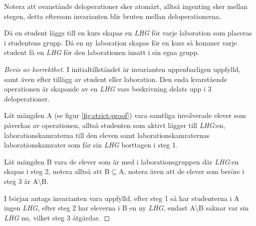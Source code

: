 Notera att ovanstånde deloperationer sker atomärt, alltså ingenting sker mellan stegen, detta eftersom invarianten blir bruten mellan deloperationerna.

Då en student läggs till en kurs skapas en \emph{LHG} för varje laboration som placeras i studentens grupp. Då en ny laboration skapas för en kurs så kommer varje student få en \emph{LHG} för den laborationen insatt i sin egna grupp.

\begin{proof}[Bevis av korrekthet]
I initialtillståndet är invarianten uppenbarligen uppfylld, samt även efter tillägg av student eller laboration. Den enda kvarstående operationen är skapande av en \emph{LHG} vars beskrivning delats upp i 3 deloperationer. 

Låt mängden A (se figur \ref{fig:strict-proof}) vara samtliga involverade elever som påverkas av operationen, alltså studenten som aktivt lägger till \emph{LHG}:en, laborationskamraterna till den eleven samt laborationskamraternas laborationskamrater som får sin \emph{LHG} borttagen i steg 1. 

Låt mängden B vara de elever som är med i laborationsgruppen där \emph{LHG}:en skapas i steg 2, notera alltså att B$\subseteq$A, notera även att de elever som berörs i steg 3 är A$\setminus$B.

I början antags invarianten vara uppfylld, efter steg 1 så har studenterna i A ingen \emph{LHG}, efter steg 2 har eleverna i B en ny \emph{LHG}, endast A$\setminus$B saknar var sin \emph{LHG} nu, vilket steg 3 åtgärdar. \qedhere
\end{proof}
 
